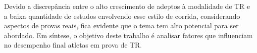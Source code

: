 Devido a discrepância entre o alto crescimento de adeptos à modalidade de TR e a baixa quantidade de estudos envolvendo esse estilo de corrida, considerando aspectos de provas reais, fica evidente que o tema tem alto potencial para ser abordado. Em síntese, o objetivo deste trabalho é analisar fatores que influenciam no desempenho final atletas em prova de TR.





















